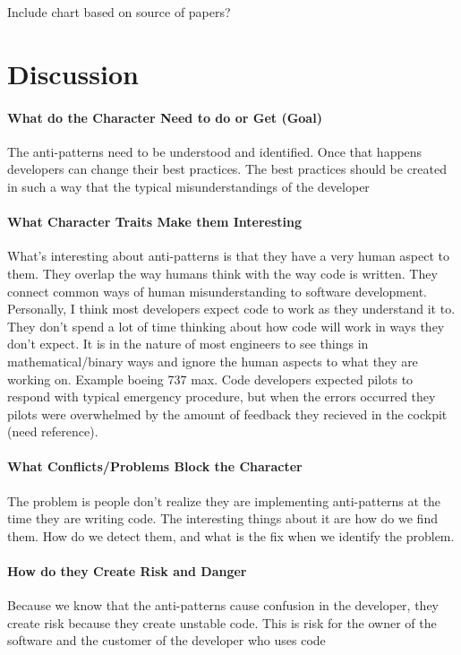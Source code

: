 \documentclass[conference]{IEEEtran}
\begin{document}
Include chart based on source of papers?

\section{Discussion}

\paragraph{What do the Character Need to do or Get (Goal)}
The anti-patterns need to be understood and identified.
Once that happens developers can change their best practices.
The best practices should be created in such a way that the typical misunderstandings of the developer


\paragraph{What Character Traits Make them Interesting}
What's interesting about anti-patterns is that they have a very human aspect to them. 
They overlap the way humans think with the way code is written. 
They connect common ways of human misunderstanding to software development. 
Personally, I think most developers expect code to work as they understand it to. 
They don't spend a lot of time thinking about how code will work in ways they don't expect.
It is in the nature of most engineers to see things in mathematical/binary ways and ignore the human aspects to what they are working on.
Example boeing 737 max.
Code developers expected pilots to respond with typical emergency procedure, but when the errors occurred they pilots were overwhelmed by the amount of feedback they recieved in the cockpit (need reference).
\paragraph{What Conflicts/Problems Block the Character}

The problem is people don't realize they are implementing anti-patterns at the time they are writing code.
The interesting things about it are how do we find them. 
How do we detect them, and what is the fix when we identify the problem.

\paragraph{How do they Create Risk and Danger}
Because we know that the anti-patterns cause confusion in the developer, they create risk because they create unstable code. 
This is risk for the owner of the software and the customer of the developer who uses code
\end{document}
